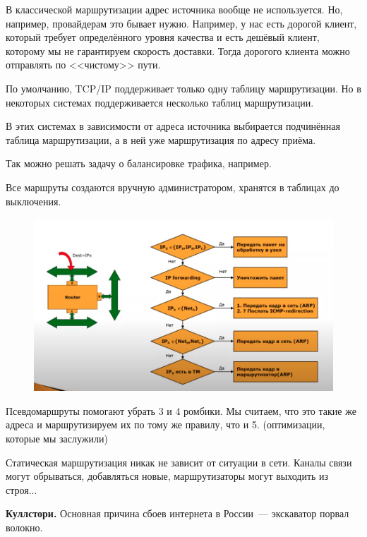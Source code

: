 В классической маршрутизации адрес источника вообще не используется. Но, например, провайдерам это бывает нужно. Например, у нас есть дорогой клиент, который требует определённого уровня качества и есть дешёвый клиент, которому мы не гарантируем скорость доставки. Тогда дорогого клиента можно отправлять по <<чистому>> пути.

По умолчанию, TCP/IP поддерживает только одну таблицу маршрутизации. Но в некоторых системах поддерживается несколько таблиц маршрутизации.

В этих системах в зависимости от адреса источника выбирается подчинённая таблица маршрутизации, а в ней уже маршрутизация по адресу приёма.

Так можно решать задачу о балансировке трафика, например.


Все маршруты создаются вручную администратором, хранятся в таблицах до выключения.

\begin{figure}[H]
  \centering
  \includegraphics[width=15cm]{images/04/03}
\end{figure}

Псевдомаршруты помогают убрать 3 и 4 ромбики. Мы считаем, что это такие же адреса и маршрутизируем их по тому же правилу, что и 5. (оптимизации, которые мы заслужили)


Статическая маршрутизация никак не зависит от ситуации в сети. Каналы связи могут обрываться, добавляться новые, маршрутизаторы могут выходить из строя...

{\bf Куллстори.} Основная причина сбоев интернета в России~--- экскаватор порвал волокно.

